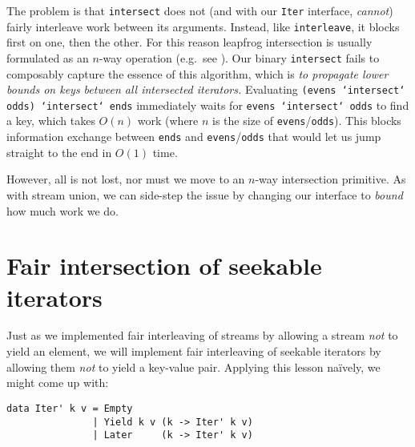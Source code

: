\documentclass[acmsmall,screen,review,anonymous,dvipsnames,svgnames]{acmart}
\newcommand\hask[1]{\texttt{#1}}
\newcommand\ttt\texttt
\begin{document}
The problem is that \ttt{intersect} does not (and with our \hask{Iter} interface, \emph{cannot}) fairly interleave work between its arguments.
Instead, like \ttt{interleave}, it blocks first on one, then the other.
For this reason leapfrog intersection is usually formulated as an $n$-way operation (e.g.\ see \citet{lftj}).
Our binary \ttt{intersect} fails to composably capture the essence of this algorithm, which is \emph{to propagate lower bounds on keys between all intersected iterators.}
Evaluating \ttt{(evens `intersect` odds) `intersect` ends} immediately waits for \ttt{evens `intersect` odds} to find a key, which takes $O(n)$ work (where $n$ is the size of \ttt{evens}/\ttt{odds}).
This blocks information exchange between \ttt{ends} and \ttt{evens}/\ttt{odds} that would let us jump straight to the end in $O(1)$ time.

However, all is not lost, nor must we move to an $n$-way intersection primitive.
As with stream union, we can side-step the issue by changing our interface to \emph{bound} how much work we do.


\section{Fair intersection of seekable iterators}
\label{sec:fair-intersection}

Just as we implemented fair interleaving of streams by allowing a stream \emph{not} to yield an element, we will implement fair interleaving of seekable iterators by allowing them \emph{not} to yield a key-value pair.
Applying this lesson na\"ively, we might come up with:

\begin{verbatim}
data Iter' k v = Empty
               | Yield k v (k -> Iter' k v)
               | Later     (k -> Iter' k v)
\end{verbatim}
\end{document}
